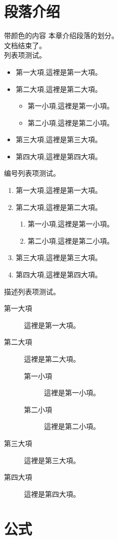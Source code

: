 \documentclass[12pt,a4paper]{report}
\begin{document}
\section{段落介绍}
\textcolor[rgb]{0.00, 0.50, 0.00}{带颜色的内容}
本章介绍段落的划分。\\
文档结束了。\\
列表项测试。
\begin{itemize}
	\item 第一大項,這裡是第一大項。
	\item 第二大項,這裡是第二大項。
		\begin{itemize}
			\item 第一小項,這裡是第一小項。
			\item 第二小項,這裡是第二小項。
		\end{itemize}
	\item 第三大項,這裡是第三大項。
	\item 第四大項,這裡是第四大項。
\end{itemize}
编号列表项测试。
\begin{enumerate}
	\item 第一大項,這裡是第一大項。
	\item 第二大項,這裡是第二大項。
		\begin{enumerate}
			\item 第一小項,這裡是第一小項。
			\item 第二小項,這裡是第二小項。
		\end{enumerate}
	\item 第三大項,這裡是第三大項。
	\item 第四大項,這裡是第四大項。
\end{enumerate}
描述列表项测试。
\begin{description}
	\item[第一大項] 這裡是第一大項。
	\item[第二大項] 這裡是第二大項。
		\begin{description}
			\item[第一小項] 這裡是第一小項。
			\item[第二小項] 這裡是第二小項。
		\end{description}
	\item[第三大項] 這裡是第三大項。
	\item[第四大項] 這裡是第四大項。
\end{description}
\newpage

\section{公式}
\end{document}
